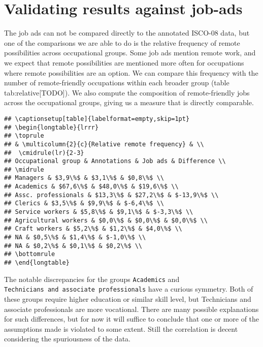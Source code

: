 \documentclass[11pt,]{article}
\begin{document}
\hypertarget{validating-results-against-job-ads}{%
\section{Validating results against
job-ads}\label{validating-results-against-job-ads}}

The job ads can not be compared directly to the annotated ISCO-08 data,
but one of the comparisons we are able to do is the relative frequency
of remote possibilities across occupational groups. Some job ads mention
remote work, and we expect that remote possibilities are mentioned more
often for occupations where remote possibilities are an option. We can
compare this frequency with the number of remote-friendly occupations
within each broader group (table tab:relative{[}TODO{]}). We also
compute the composition of remote-friendly jobs across the occupational
groups, giving us a measure that is directly comparable.

\begin{verbatim}
## \captionsetup[table]{labelformat=empty,skip=1pt}
## \begin{longtable}{lrrr}
## \toprule
## & \multicolumn{2}{c}{Relative remote frequency} & \\ 
##  \cmidrule(lr){2-3}
## Occupational group & Annotations & Job ads & Difference \\ 
## \midrule
## Managers & $3,9\%$ & $3,1\%$ & $0,8\%$ \\ 
## Academics & $67,6\%$ & $48,0\%$ & $19,6\%$ \\ 
## Assc. professionals & $13,3\%$ & $27,2\%$ & $-13,9\%$ \\ 
## Clerics & $3,5\%$ & $9,9\%$ & $-6,4\%$ \\ 
## Service workers & $5,8\%$ & $9,1\%$ & $-3,3\%$ \\ 
## Agricultural workers & $0,0\%$ & $0,0\%$ & $0,0\%$ \\ 
## Craft workers & $5,2\%$ & $1,2\%$ & $4,0\%$ \\ 
## NA & $0,5\%$ & $1,4\%$ & $-1,0\%$ \\ 
## NA & $0,2\%$ & $0,1\%$ & $0,2\%$ \\ 
## \bottomrule
## \end{longtable}
\end{verbatim}

The notable discrepancies for the groups \texttt{Academics} and
\texttt{Technicians\ and\ associate\ professionals} have a curious
symmetry. Both of these groups require higher education or similar skill
level, but Technicians and associate professionals are more vocational.
There are many possible explanations for such differences, but for now
it will suffice to conclude that one or more of the assumptions made is
violated to some extent. Still the correlation is decent considering the
spuriousness of the data.
\end{document}
